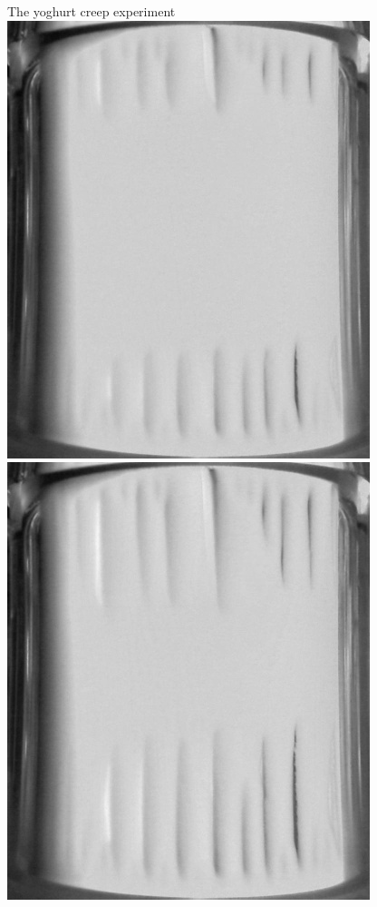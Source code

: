 \begin{frame}{The yoghurt creep experiment}
\includegraphics[width=\mylena]{Y110_2013-03-01_03-19-47.jpg}\hfill
\includegraphics[width=\mylena]{Y110_2013-03-01_03-21-10.jpg}\hfill

\end{frame}
